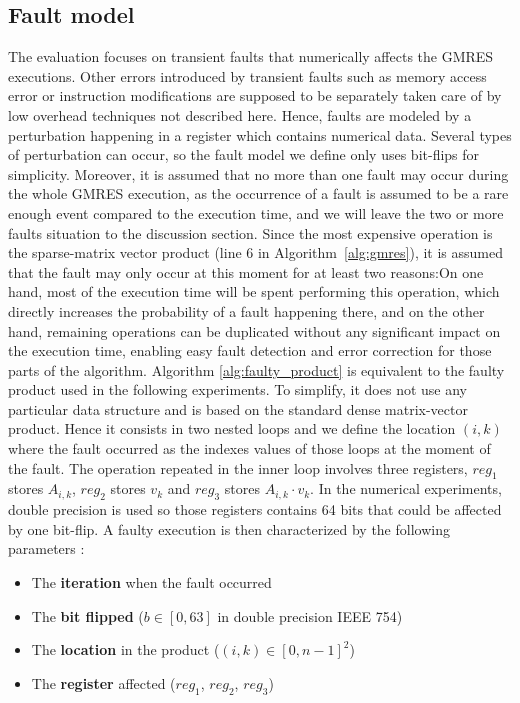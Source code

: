 \documentclass[twoside]{article}
\begin{document}
\subsection{Fault model}
The evaluation focuses on transient faults that numerically affects the GMRES executions. Other errors introduced by transient faults such as memory access error or instruction modifications are supposed to be separately taken care of by low overhead techniques not described here. Hence, faults are modeled by a perturbation happening in a register which contains numerical data. Several types of perturbation can occur, so the fault model we define only uses bit-flips for simplicity. Moreover, it is assumed that no more than one fault may occur during the whole GMRES execution, as the occurrence of a fault is assumed to be a rare enough event compared to the execution time, and we will leave the two or more faults situation to the discussion section. Since the most expensive operation is the sparse-matrix vector product  (line 6 in Algorithm~\ref{alg:gmres}), it is assumed that the fault may only occur at this moment for at least two reasons:On one hand, most of the execution time will be spent performing this operation, which directly increases the probability of a fault happening there, and on the other hand, remaining operations can be duplicated without any significant impact on the execution time, enabling easy fault detection and error correction for those parts of the algorithm. Algorithm \ref{alg:faulty_product} is equivalent to the faulty product used in the following experiments. To simplify, it does not use any particular data structure and is based on the standard dense matrix-vector product. Hence it consists in two nested loops and we define the location $(i, k)$ where the fault occurred as the indexes values of those loops at the moment of the fault. The operation repeated in the inner loop involves three registers, $reg_1$ stores $A_{i, k}$, $reg_2$ stores $v_k$ and $reg_3$ stores $A_{i, k} \cdot v_k$. In the numerical experiments, double precision is used so those registers contains 64 bits that could be affected by one bit-flip.
A faulty execution is then characterized by the following parameters :
\begin{itemize}
\item The \textbf{iteration} when the fault occurred
\item The \textbf{bit flipped} ($b \in [0, 63]$ in double precision IEEE 754)
\item The \textbf{location} in the product ($(i, k) \in [0, n-1]^2$)
\item The \textbf{register} affected ($reg_1$, $reg_2$, $reg_3$)
\end{itemize}
\end{document}
